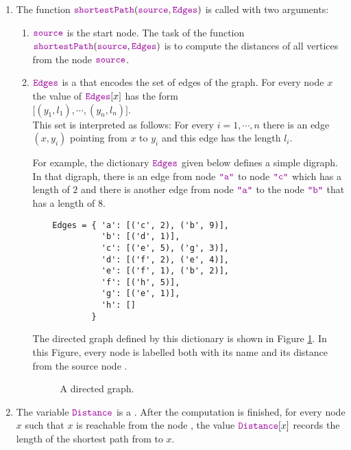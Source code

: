 \noindent
\begin{enumerate}
\item The function $\mytt{shortestPath}(\mytt{source}, \mytt{Edges})$ is called with two arguments:
      \begin{enumerate}
      \item $\mytt{source}$ is the start node.  The task of the function
            $\mytt{shortestPath}(\mytt{source}, \mytt{Edges})$ is to compute the distances of all 
            vertices from the node $\mytt{source}$.
      \item $\mytt{Edges}$ is a  that encodes the set of edges of the graph.  For
            every node $x$ the value of $\mytt{Edges}[x]$ has the form
            \\[0.2cm]
            \hspace*{1.3cm}
            $\bigl[ (y_1, l_1), \cdots, (y_n, l_n) \bigr]$.
            \\[0.2cm]
            This set is interpreted as follows: For every $i = 1,\cdots,n$ there is an edge
            $(x, y_i)$ pointing from $x$ to $y_i$ and this edge has the length $l_i$.

            For example, the dictionary $\mytt{Edges}$ given below defines a simple digraph.
            In that digraph, there is an edge from node $\mytt{"a"}$ to node $\mytt{"c"}$ which has a
            length of $2$ and there is another edge from node $\mytt{"a"}$ to the node $\mytt{"b"}$ that has a length of $8$.
            \begin{verbatim}
    Edges = { 'a': [('c', 2), ('b', 9)], 
              'b': [('d', 1)],
              'c': [('e', 5), ('g', 3)],  
              'd': [('f', 2), ('e', 4)],  
              'e': [('f', 1), ('b', 2)],
              'f': [('h', 5)],
              'g': [('e', 1)],
              'h': []
            }
            \end{verbatim}
      
      The directed graph defined by this dictionary is shown in Figure \ref{fig:directed-graph.pdf}.
      In this Figure, every node is labelled both with its name and its distance from the source node .
      \begin{figure}[!ht]
        \centering
        \caption{A directed graph.}
        \label{fig:directed-graph.pdf}
      \end{figure}
      \end{enumerate}
\item The variable $\mytt{Distance}$ is a .  After the computation is
      finished, for every node $x$ such that $x$ is reachable from the node ,
      the value $\mytt{Distance}[x]$ records the length of the shortest path from  to $x$.


\end{enumerate}
